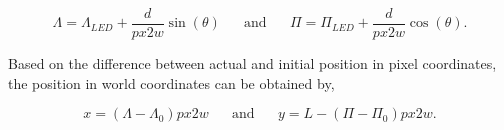 \begin{equation}
    \Lambda = \Lambda_{LED} + \frac{d}{px2w} \sin(\theta) \hspace{20pt} \text{and}  \hspace{20pt}  \Pi = \Pi_{LED} + \frac{d}{px2w} \cos(\theta).
\end{equation}

Based on the difference between actual and initial position in pixel coordinates, the position in world coordinates can be obtained by, 

\begin{equation}
    x = (\Lambda-\Lambda_0)px2w \hspace{20pt} \text{and} \hspace{20pt} y = L - (\Pi - \Pi_0)px2w. 
\end{equation}

